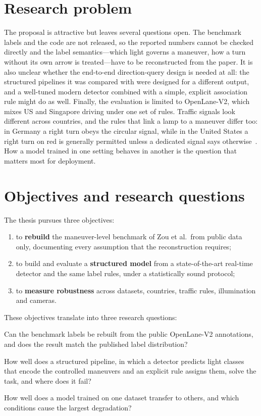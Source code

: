 \section*{Research problem}

The proposal is attractive but leaves several questions open. The benchmark labels and the code are not
released, so the reported numbers cannot be checked directly and the label semantics---which light
governs a maneuver, how a turn without its own arrow is treated---have to be reconstructed from the
paper. It is also unclear whether the end-to-end direction-query design is needed at all: the structured
pipelines it was compared with were designed for a different output, and a well-tuned modern detector
combined with a simple, explicit association rule might do as well. Finally, the evaluation is limited to OpenLane-V2,
which mixes US and Singapore driving under one set of rules. Traffic signals look different across
countries, and the rules that link a lamp to a maneuver differ too: in Germany a right turn obeys the
circular signal, while in the United States a right turn on red is generally permitted unless a
dedicated signal says otherwise~\cite{fhwa2009mutcd,stvo}. How a model trained in one setting behaves in
another is the question that matters most for deployment.

\section*{Objectives and research questions}

The thesis pursues three objectives:
\begin{enumerate}
  \item to \textbf{rebuild} the maneuver-level benchmark of Zou et al.\ from public data only,
        documenting every assumption that the reconstruction requires;
  \item to build and evaluate a \textbf{structured model} from a state-of-the-art real-time detector and
        the same label rules, under a statistically sound protocol;
  \item to \textbf{measure robustness} across datasets, countries, traffic rules, illumination and
        cameras.
\end{enumerate}
These objectives translate into three research questions:
\begin{description}[leftmargin=1.2cm,style=nextline]
  \item[RQ1] Can the benchmark labels be rebuilt from the public OpenLane-V2 annotations, and does the
             result match the published label distribution?
  \item[RQ2] How well does a structured pipeline, in which a detector predicts light classes that encode
             the controlled maneuvers and an explicit rule assigns them, solve the task, and where does
             it fail?
  \item[RQ3] How well does a model trained on one dataset transfer to others, and which conditions
             cause the largest degradation?
\end{description}

